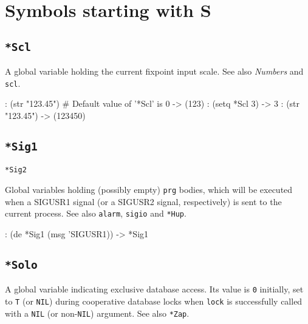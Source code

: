 %
%
%



\chapter{Symbols starting with S}
\label{cha:func-ref-S-functions-starting-with-S}
 
\section*{\texttt{*Scl}}
\label{sec:func-ref-S-*Scl}


A global variable holding the current fixpoint input scale. See also
\emph{Numbers} and \texttt{scl}.


\begin{wideverbatim}
: (str "123.45")  # Default value of '*Scl' is 0
-> (123)
: (setq *Scl 3)
-> 3
: (str "123.45")
-> (123450)
\end{wideverbatim}

 
\section*{\texttt{*Sig1}}
\label{sec:func-ref-S-*Sig1}


\texttt{*Sig2}

Global variables holding (possibly empty) \texttt{prg} bodies, which will be
executed when a SIGUSR1 signal (or a SIGUSR2 signal, respectively) is
sent to the current process. See also \texttt{alarm}, \texttt{sigio} and \texttt{*Hup}.


\begin{wideverbatim}
: (de *Sig1 (msg 'SIGUSR1))
-> *Sig1
\end{wideverbatim}

 
\section*{\texttt{*Solo}}
\label{sec:func-ref-S-*Solo}


A global variable indicating exclusive database access. Its value is \texttt{0}
initially, set to \texttt{T} (or \texttt{NIL}) during cooperative database locks when
\texttt{lock} is successfully called with a \texttt{NIL} (or non-\texttt{NIL}) argument. See
also \texttt{*Zap}.


